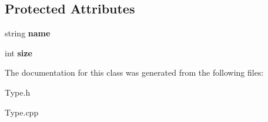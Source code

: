 \subsection*{Protected Attributes}
\begin{DoxyCompactItemize}
\item 
\hypertarget{classType_ad7eeefba3dfcecbdaa98d46aaa84e389}{string {\bfseries name}}\label{classType_ad7eeefba3dfcecbdaa98d46aaa84e389}

\item 
\hypertarget{classType_a871302dc63ac1a37c0b6a225cf82048d}{int {\bfseries size}}\label{classType_a871302dc63ac1a37c0b6a225cf82048d}

\end{DoxyCompactItemize}


The documentation for this class was generated from the following files\-:\begin{DoxyCompactItemize}
\item 
Type.\-h\item 
Type.\-cpp\end{DoxyCompactItemize}
